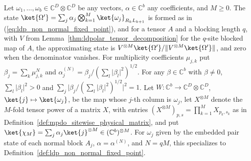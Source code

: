 \begin{definition}
    \label{def:ldp_pair_family_fixed_point}
    \leanok
    Let $\omega_1,\dots,\omega_b\in\mathbb C^D\otimes\mathbb C^D$ be any vectors,
    $\alpha\in\mathbb C^b$ any coefficients, and $M\ge0$. The state
    $\ket{\Omega'}=\sum_j\alpha_j\bigotimes_{k=1}^M\ket{\omega_j}_{R_kL_{k+1}}$ is
    formed as in (\ref{eq:ldp_non_normal_fixed_point}), and for a tensor $A$ and a
    blocking length $q$, with $V$ from Lemma~\ref{thm:ldpolar_tensor_decomposition}
    for the $q$-site blocked map of $A$, the approximating state is
    $V^{\otimes M}\ket{\Omega'}/\lVert V^{\otimes M}\ket{\Omega'}\rVert$, and zero when
    the denominator vanishes. For multiplicity coefficients $\mu_{j,k}$ put
    $\beta_j=\sum_k\mu_{j,k}^N$ and $\alpha^{(N)}_j=\beta_j/(\sum_l\lvert\beta_l\rvert^2)^{1/2}$.
    For any $\beta\in\mathbb C^b$ with $\beta\neq0$, $\sum_l\lvert\beta_l\rvert^2>0$ and
    $\sum_j\lvert\beta_j/(\sum_l\lvert\beta_l\rvert^2)^{1/2}\rvert^2=1$.
    Let $W\colon\mathbb C^b\to\mathbb C^D\otimes\mathbb C^D$,
    $\ket{j}\mapsto\ket{\omega_j}$, be the map whose $j$-th column is $\omega_j$,
    let $X^{\otimes M}$ denote the $M$-fold tensor power of a matrix $X$, with entries
    $(X^{\otimes M})_{p,s}=\prod_{k=1}^M X_{p_k,s_k}$ as in
    Definition~\ref{def:mpdo_sitewise_physical_matrix}, and put
    $\ket{\chi_M}=\sum_j\alpha_j\ket{j}^{\otimes M}\in(\mathbb C^b)^{\otimes M}$.
    For $\omega_j$ given by the embedded pair state of each normal block $A_j$,
    $\alpha=\alpha^{(N)}$, and $N=qM$, this specializes to
    Definition~\ref{def:ldp_non_normal_fixed_point}.
\end{definition}

